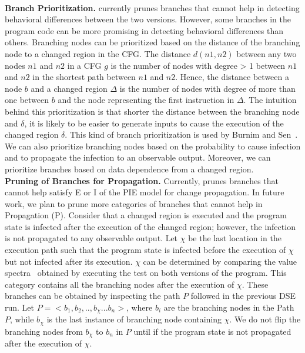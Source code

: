 \\ \textbf{Branch Prioritization.}  currently prunes branches that cannot help in detecting behavioral differences between the two versions. However, some branches in the program code can be more promising in detecting behavioral differences than others. Branching nodes can be prioritized based on the distance of the branching node to a changed region in the CFG. The distance $d(n1, n2)$ between any two nodes $n1$ and $n2$  in a CFG $g$ is the number of nodes with degree > 1 between $n1$ and $n2$ in the shortest path between $n1$ and $n2$. Hence, the distance between a node $b$ and a changed region $\Delta$ is the number of nodes with degree of more than one between $b$ and the node representing the first instruction in $\Delta$. The intuition behind this prioritization is that shorter the distance between the branching node and $\delta$, it is likely to be easier to generate inputs to cause the execution of the changed region $\delta$. This kind of branch prioritization is used by Burnim and Sen~\cite{burnim}. We can also prioritize branching nodes based on the probability to cause infection and to propagate the infection to an observable output. Moreover, we can prioritize branches based on data dependence from a changed region.
\\ \textbf{Pruning of Branches for Propagation.} Currently,  prunes branches that cannot help satisfy E or I of the PIE model for change propagation. In future work, we plan to prune more categories of branches that cannot help in Propagation (P). Consider that a changed region is executed and the program state is infected after the execution of the changed region; however, the infection is not propagated to any observable output. Let $\chi$ be the last location in the execution path such that the program state is infected before the execution of $\chi$ but not infected after its execution. $\chi$ can be determined by comparing the value spectra~\cite{xie05:spectra, xie05:checking} obtained by executing the test on both versions of the program. This category contains all the branching nodes after the execution of $\chi$. These branches can be obtained by inspecting the path $P$ followed in the previous DSE run. Let $P = <b_1, b_2,.., b_\chi...b_n>$, where $b_i$ are the branching nodes in the Path $P$, while $b_\chi$ is the last instance of branching node containing $\chi$. We do not flip the branching nodes from $b_\chi$ to $b_n$ in $P$ until if the program state is not propagated after the execution of $\chi$.

